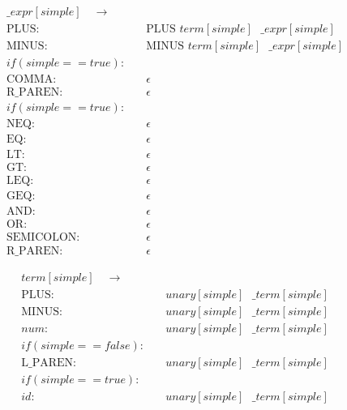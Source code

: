 \documentclass{article}
\begin{document}
\begin{align*}
\_expr[simple] \quad  \to & \quad\\
\text{PLUS}: &\quad \text{PLUS }  term[simple] \text{ } \_expr[simple] \\
\text{MINUS}: &\quad \text{MINUS }  term[simple] \text{ } \_expr[simple] \\
if (simple == true): &\\
\text{COMMA} : & \quad \epsilon \\
\text{R\_PAREN} : & \quad \epsilon \\
if (simple == true): &\\
\text{NEQ} : & \quad \epsilon \\
\text{EQ} : & \quad \epsilon \\
\text{LT} : & \quad \epsilon \\
\text{GT} : & \quad \epsilon \\
\text{LEQ} : & \quad \epsilon \\
\text{GEQ} : & \quad \epsilon \\
\text{AND} : & \quad \epsilon \\
\text{OR} : & \quad \epsilon \\
\text{SEMICOLON} : & \quad \epsilon \\
\text{R\_PAREN} :  & \quad \epsilon
\end{align*}

\begin{align*}
term[simple] \quad  \to & \quad\\
\text{PLUS}: & \quad unary[simple] \text{ } \_term[simple] \\
\text{MINUS}: & \quad unary[simple] \text{ } \_term[simple] \\
num: & \quad unary[simple] \text{ } \_term[simple] \\
if (simple == false): &\\
\text{L\_PAREN}: & \quad unary[simple] \text{ } \_term[simple] \\
if (simple == true): &\\
id: & \quad unary[simple] \text{ } \_term[simple] 
\end{align*}
\end{document}
